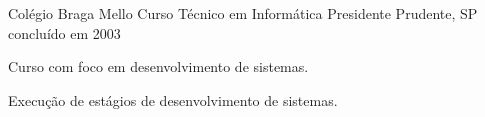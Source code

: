 \begin{cventries}
  \cventry
  {Colégio Braga Mello} %
  {Curso Técnico em Informática} %
  {Presidente Prudente, SP} %
  {concluído em 2003} %
  {
    \begin{cvitems} %
      \item {Curso com foco em desenvolvimento de sistemas.}
      \item {Execução de estágios de desenvolvimento de sistemas.}
    \end{cvitems}
  }





\end{cventries}
